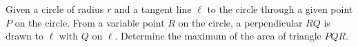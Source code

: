 Given a circle of radius $r$ and a tangent line $\ell$ to the circle through a given point $P$ on the circle.  From a variable point $R$ on the circle, a perpendicular $RQ$ is drawn to $\ell$ with $Q$ on $\ell$.  Determine the maximum of the area of triangle $PQR$.